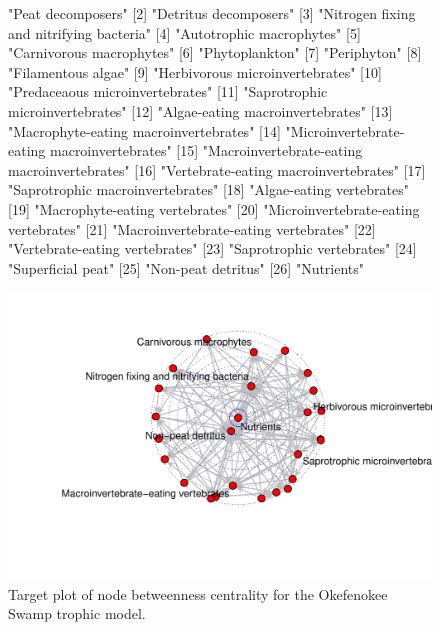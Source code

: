 \documentclass[article]{jss}
\begin{document}
\begin{figure}[!htbp]
  \center
\begin{Schunk}
\begin{Soutput}
 [1] "Peat decomposers"                           
 [2] "Detritus decomposers"                       
 [3] "Nitrogen fixing and nitrifying bacteria"    
 [4] "Autotrophic macrophytes"                    
 [5] "Carnivorous macrophytes"                    
 [6] "Phytoplankton"                              
 [7] "Periphyton"                                 
 [8] "Filamentous algae"                          
 [9] "Herbivorous microinvertebrates"             
[10] "Predaceaous microinvertebrates"             
[11] "Saprotrophic microinvertebrates"            
[12] "Algae-eating macroinvertebrates"            
[13] "Macrophyte-eating macroinvertebrates"       
[14] "Microinvertebrate-eating macroinvertebrates"
[15] "Macroinvertebrate-eating macroinvertebrates"
[16] "Vertebrate-eating macroinvertebrates"       
[17] "Saprotrophic macroinvertebrates"            
[18] "Algae-eating vertebrates"                   
[19] "Macrophyte-eating vertebrates"              
[20] "Microinvertebrate-eating vertebrates"       
[21] "Macroinvertebrate-eating vertebrates"       
[22] "Vertebrate-eating vertebrates"              
[23] "Saprotrophic vertebrates"                   
[24] "Superficial peat"                           
[25] "Non-peat detritus"                          
[26] "Nutrients"                                  
\end{Soutput}
\end{Schunk}
\includegraphics{enaR-vignette-055}
\caption{Target plot of node betweenness centrality for the Okefenokee
  Swamp trophic model.} \label{fig:target}
\end{figure}
\end{document}
